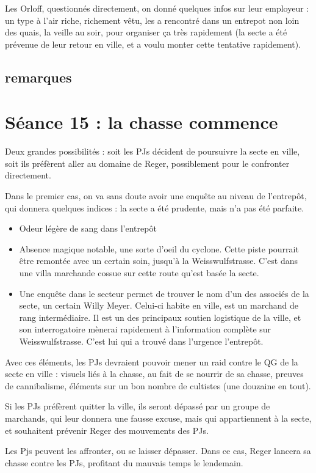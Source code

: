 \documentclass[10pt,a4paper]{book}
\begin{document}
Les Orloff, questionnés directement, on donné quelques infos sur leur employeur : un type à l'air riche, richement vêtu, les a rencontré dans un entrepot non loin des quais, la veille au soir, pour organiser ça très rapidement (la secte a été prévenue de leur retour en ville, et a voulu monter cette tentative rapidement).
\subsection{remarques}
\section{Séance 15 : la chasse commence}
Deux grandes possibilités : soit les PJs décident de poursuivre la secte en ville, soit ils préfèrent aller au domaine de Reger, possiblement pour le confronter directement.

Dans le premier cas, on va sans doute avoir une enquête au niveau de l'entrepôt, qui donnera quelques indices : la secte a été prudente, mais n'a pas été parfaite.
\begin{itemize}
\item Odeur légère de sang dans l'entrepôt
\item Absence magique notable, une sorte d'oeil du cyclone. Cette piste pourrait être remontée avec un certain soin, jusqu'à la Weisswulfstrasse. C'est dans une villa marchande cossue sur cette route qu'est basée la secte.
\item Une enquête dans le secteur permet de trouver le nom d'un des associés de la secte, un certain Willy Meyer. Celui-ci habite en ville, est un marchand de rang intermédiaire. Il est un des principaux soutien logistique de la ville, et son interrogatoire mènerai rapidement à l'information complète sur Weisswulfstrasse. C'est lui qui a trouvé dans l'urgence l'entrepôt.
\end{itemize}
Avec ces éléments, les PJs devraient pouvoir mener un raid contre le QG de la secte en ville : visuels liés à la chasse, au fait de se nourrir de sa chasse, preuves de cannibalisme, éléments sur un bon nombre de cultistes (une douzaine en tout).

Si les PJs préfèrent quitter la ville, ils seront dépassé par un groupe de marchands, qui leur donnera une fausse excuse, mais qui appartiennent à la secte, et souhaitent prévenir Reger des mouvements des PJs.

Les Pjs peuvent les affronter, ou se laisser dépasser. Dans ce cas, Reger lancera sa chasse contre les PJs, profitant du mauvais temps le lendemain. 
\end{document}
